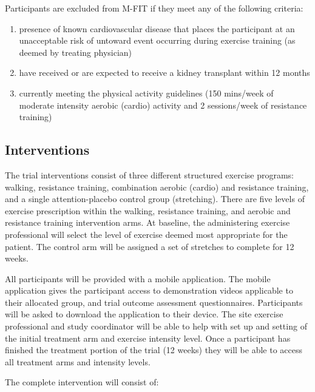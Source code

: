 \documentclass[11pt,parskip=half-]{scrartcl}
\providecommand{\tightlist}{%
  \setlength{\itemsep}{0pt}\setlength{\parskip}{0pt}}
\begin{document}
Participants are excluded from M-FIT if they meet any of the following criteria:

\begin{enumerate}
  \def\labelenumi{\arabic{enumi}.}
  \tightlist
  \item presence of known cardiovascular disease that places the participant at an unacceptable risk of untoward event occurring during exercise training (as deemed by treating physician)
  \item have received or are expected to receive a kidney transplant within 12 months
  \item currently meeting the physical activity guidelines (150 mins/week of moderate intensity aerobic (cardio) activity and 2 sessions/week of resistance training)
\end{enumerate}


\subsection{Interventions}\label{interventions}

The trial interventions consist of three different structured exercise programs: walking, resistance training, combination aerobic (cardio) and resistance training, and a single attention-placebo control group (stretching). There are five levels of exercise prescription within the walking, resistance training, and aerobic and resistance training intervention arms. At baseline, the administering exercise professional will select the level of exercise deemed most appropriate for the patient. The control arm will be assigned a set of stretches to complete for 12 weeks.

All participants will be provided with a mobile application. The mobile application gives the participant access to demonstration videos applicable to their allocated group, and trial outcome assessment questionnaires. Participants will be asked to download the application to their device. The site exercise professional and study coordinator will be able to help with set up and setting of the initial treatment arm and exercise intensity level. Once a participant has finished the treatment portion of the trial (12 weeks) they will be able to access all treatment arms and intensity levels.

The complete intervention will consist of:
\end{document}
